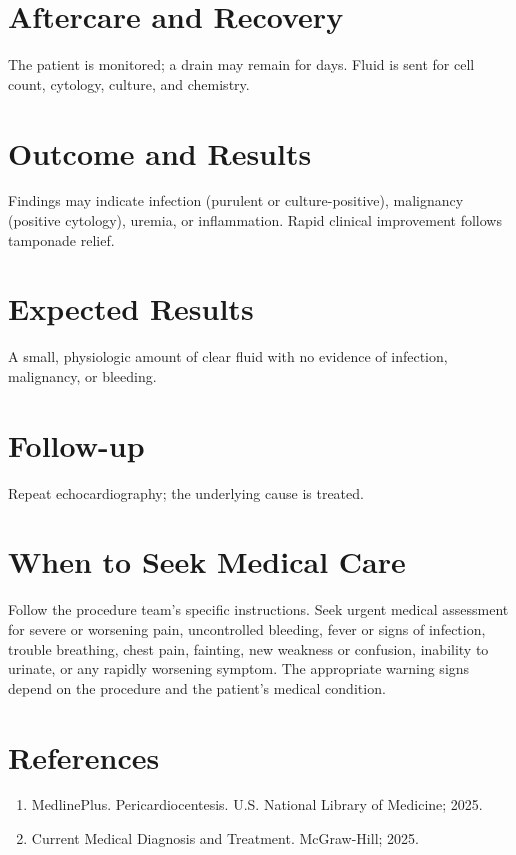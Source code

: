 \section*{Aftercare and Recovery}
The patient is monitored; a drain may remain for days. Fluid is sent for cell count, cytology, culture, and chemistry.

\section*{Outcome and Results}
Findings may indicate infection (purulent or culture-positive), malignancy (positive cytology), uremia, or inflammation. Rapid clinical improvement follows tamponade relief.

\section*{Expected Results}
A small, physiologic amount of clear fluid with no evidence of infection, malignancy, or bleeding.

\section*{Follow-up}
Repeat echocardiography; the underlying cause is treated.

\section*{When to Seek Medical Care}
Follow the procedure team's specific instructions. Seek urgent medical assessment for severe or worsening pain, uncontrolled bleeding, fever or signs of infection, trouble breathing, chest pain, fainting, new weakness or confusion, inability to urinate, or any rapidly worsening symptom. The appropriate warning signs depend on the procedure and the patient's medical condition.

\section*{References}
\begin{enumerate}
  \item MedlinePlus. Pericardiocentesis. U.S. National Library of Medicine; 2025.
  \item Current Medical Diagnosis and Treatment. McGraw-Hill; 2025.
\end{enumerate}

\clearpage
